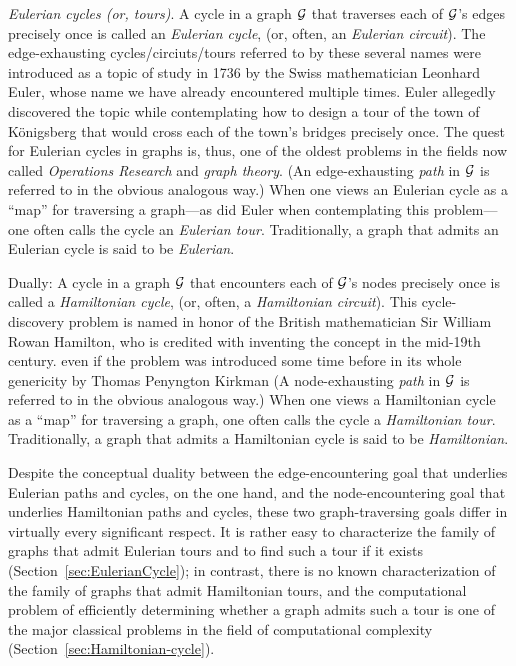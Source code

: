 \smallskip

{\it Eulerian cycles (or, tours)}.  A cycle in a graph $\mbox{$\cal G$}$ that
traverses each of $\mbox{$\cal G$}$'s edges precisely once is called an {\it
  Eulerian cycle}, 
(or, often, an {\it Eulerian circuit}).    The edge-exhausting
cycles/circiuts/tours referred to by these several names were
introduced as a topic of study in 1736 by the Swiss mathematician
 Leonhard Euler, whose name we have already
encountered multiple times.  Euler allegedly discovered the topic
while contemplating how to design a tour of the town of K\"{o}nigsberg
that would cross each of the town's bridges precisely once.  The quest
for Eulerian cycles in graphs is, thus, one of the oldest problems in
the fields now called {\it Operations Research} and {\it graph
  theory}.  (An edge-exhausting {\em path} in $\mbox{$\cal G$}$ is referred to in
the obvious analogous way.)  When one views an Eulerian cycle as a
``map'' for traversing a graph---as did Euler when contemplating this
problem---one often calls the cycle an {\it Eulerian tour}.
  Traditionally, a
graph that admits an Eulerian cycle is said to be {\it
  Eulerian}.  

\medskip

Dually: A cycle in a graph $\mbox{$\cal G$}$ that encounters each of $\mbox{$\cal G$}$'s nodes
precisely once is called a {\it Hamiltonian cycle},
  (or, often,
a {\it Hamiltonian circuit}). 
 This cycle-discovery problem is named in
honor of the British mathematician Sir William Rowan Hamilton,
 who is credited with inventing the
concept in the mid-19th century.  
{\Denis even if the problem was introduced some time before in its whole genericity by 
Thomas Penyngton Kirkman} (A node-exhausting {\em path} in
$\mbox{$\cal G$}$ is referred to in the obvious analogous way.)  When one views a
Hamiltonian cycle as a ``map'' for traversing a graph, one often calls
the cycle a {\it Hamiltonian tour}.  
 Traditionally, a graph that admits a
Hamiltonian cycle is said to be {\it
  Hamiltonian}.  

\medskip

Despite the conceptual duality between the edge-encountering goal that
underlies Eulerian paths and cycles, on the one hand, and the
node-encountering goal that underlies Hamiltonian paths and cycles,
these two graph-traversing goals differ in virtually every significant
respect.  It is rather easy to characterize the family of graphs that
admit Eulerian tours and to find such a tour if it exists
(Section~\ref{sec:EulerianCycle}); in contrast, there is no known
characterization of the family of graphs that admit Hamiltonian tours,
and the computational problem of efficiently determining whether a
graph admits such a tour is one of the major classical problems in the
field of computational complexity  (Section~\ref{sec:Hamiltonian-cycle}).

